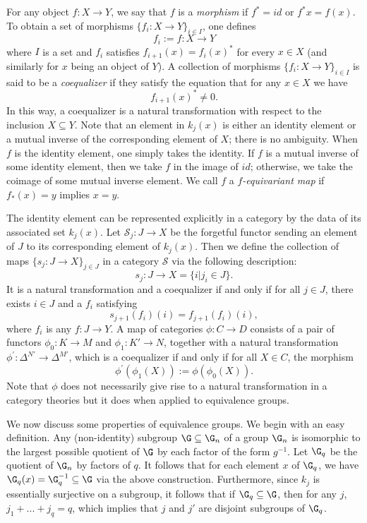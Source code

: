 \documentclass[a4paper,reqno,oneside]{article}
\begin{document}
For any object $f: X \to Y$, we say that $f$ is a \emph{morphism} if $f^*=id$ or $f^* x = f(x)$. To obtain a set of morphisms $\{ f_i: X \to Y \}_{i \in I}$, one defines
\[
f_i := f: X \to Y
\]
where $I$ is a set and $f_i$ satisfies $f_{i+1}(x) = f_{i}(x)^*$ for every $x \in X$ (and similarly for $x$ being an object of $Y$). A collection of morphisms $\{ f_i: X \to Y \}_{i \in I}$ is said to be a \emph{coequalizer} if they satisfy the equation that for any $x \in X$ we have
\[
f_{i+1}(x)^* \neq 0.
\]
In this way, a coequalizer is a natural transformation with respect to the inclusion $X \subseteq Y$. Note that an element in $k_j(x)$ is either an identity element or a mutual inverse of the corresponding element of $X$; there is no ambiguity. When $f$ is the identity element, one simply takes the identity. If $f$ is a mutual inverse of some identity element, then we take $f$ in the image of $id$; otherwise, we take the coimage of some mutual inverse element. We call $f$ a \emph{$f$-equivariant map} if $f_*(x) = y$ implies $x = y$.

The identity element can be represented explicitly in a category by the data of its associated set $k_j(x)$. Let $\mathcal{S}_j : J \to X$ be the forgetful functor sending an element of $J$ to its corresponding element of $k_j(x)$. Then we define the collection of maps $\{ s_j: J \to X \}_{j \in J}$ in a category $\mathcal S$ via the following description: 
\[
s_j: J \to X = \{ i | j_i \in J \}. 
\]
It is a natural transformation and a coequalizer if and only if for all $j \in J$, there exists $i \in J$ and a $f_i$ satisfying 
\[
s_{j+1}(f_i)(i) = f_{j+1}(f_i)(i),
\]
where $f_i$ is any $f: J \to Y$. A map of categories $\phi: C \to D$ consists of a pair of functors $\phi_0 : K \to M$ and $\phi_1 : K' \to N$, together with a natural transformation $\phi^\prime: \Delta^{N'} \to \Delta^{M'}$, which is a coequalizer if and only if for all $X \in C$, the morphism 
\[
\phi^\prime(\phi_1(X)) := \phi(\phi_0(X)).
\]
Note that $\phi$ does not necessarily give rise to a natural transformation in a category theories but it does when applied to equivalence groups.  

We now discuss some properties of equivalence groups. We begin with an easy definition. Any (non-identity) subgroup $\G \subseteq \G_n$ of a group $\G_n$ is isomorphic to the largest possible quotient of $\G$ by each factor of the form $g^{-1}$. Let $\G_q$ be the quotient of $\G_n$ by factors of $q$. It follows that for each element $x$ of $\G_q$, we have $\G_q(x) = \G_q^{-1} \subseteq \G$ via the above construction.  Furthermore, since $k_j$ is essentially surjective on a subgroup, it follows that if $\G_q \subseteq \G$, then for any $j$, $j_1 +... + j_q = q$, which implies that $j$ and $j'$ are disjoint subgroups of $\G_q$. 
\end{document}
